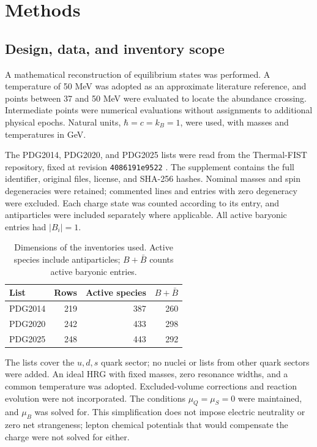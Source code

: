 \section{Methods}
\subsection{Design, data, and inventory scope}
A mathematical reconstruction of equilibrium states was performed. A temperature of 50 MeV was adopted as an approximate literature reference, and points between 37 and 50 MeV were evaluated to locate the abundance crossing. Intermediate points were numerical evaluations without assignments to additional physical epochs. Natural units, $\hbar=c=k_B=1$, were used, with masses and temperatures in GeV.

The PDG2014, PDG2020, and PDG2025 lists were read from the Thermal-FIST repository, fixed at revision \texttt{4086191e9522} \citep{TFLists2026}. The supplement contains the full identifier, original files, license, and SHA-256 hashes. Nominal masses and spin degeneracies were retained; commented lines and entries with zero degeneracy were excluded. Each charge state was counted according to its entry, and antiparticles were included separately where applicable. All active baryonic entries had $|B_i|=1$.

\begin{table}[t]
\centering\small
\caption{Dimensions of the inventories used. Active species include antiparticles; $B+\bar B$ counts active baryonic entries.}
\label{tab:inventory}
\setlength{\tabcolsep}{4pt}
\begin{tabular}{lrrr}\toprule
List & Rows & Active species & $B+\bar B$\\\midrule
PDG2014 & 219 & 387 & 260\\
PDG2020 & 242 & 433 & 298\\
PDG2025 & 248 & 443 & 292\\
\bottomrule\end{tabular}
\end{table}

The lists cover the $u,d,s$ quark sector; no nuclei or lists from other quark sectors were added. An ideal HRG with fixed masses, zero resonance widths, and a common temperature was adopted. Excluded-volume corrections and reaction evolution were not incorporated. The conditions $\mu_Q=\mu_S=0$ were maintained, and $\mu_B$ was solved for. This simplification does not impose electric neutrality or zero net strangeness; lepton chemical potentials that would compensate the charge were not solved for either.

